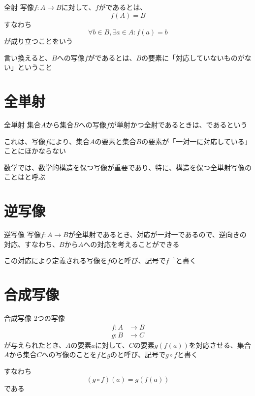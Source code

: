 \documentclass[b5paper,12pt]{jsarticle}
\begin{document}
\begin{definition}{全射}
  写像$f\colon A \to B$に対して、$f$がであるとは、
  \begin{equation*}
    f(A) = B
  \end{equation*}
  すなわち
  \begin{equation*}
    \forall b \in B, \exists a \in A\colon f(a) = b
  \end{equation*}
  が成り立つことをいう
\end{definition}

言い換えると、$B$への写像$f$がであるとは、$B$の要素に「対応していないものがない」ということ

\sectionline
\section{全単射}

\begin{definition}{全単射}
  集合$A$から集合$B$への写像$f$が単射かつ全射であるときは、であるという
\end{definition}

これは、写像$f$により、集合$A$の要素と集合$B$の要素が「一対一に対応している」ことにほかならない

\sectionline

数学では、数学的構造を保つ写像が重要であり、特に、構造を保つ全単射写像のことはと呼ぶ

\sectionline
\section{逆写像}

\begin{definition}{逆写像}
  写像$f\colon A \to B$が全単射であるとき、対応が一対一であるので、逆向きの対応、すなわち、$B$から$A$への対応を考えることができる

  この対応により定義される写像を$f$のと呼び、記号で$f^{-1}$と書く
\end{definition}

\sectionline
\section{合成写像}

\begin{definition}{合成写像}
  2つの写像
  \begin{align*}
    f\colon A & \to B \\
    g\colon B & \to C
  \end{align*}
  が与えられたとき、$A$の要素$a$に対して、$C$の要素$g(f(a))$を対応させる、集合$A$から集合$C$への写像のことを$f$と$g$のと呼び、記号で$g \circ f$と書く

  すなわち
  \begin{equation*}
    (g \circ f)(a) = g(f(a))
  \end{equation*}
  である
\end{definition}
\end{document}
